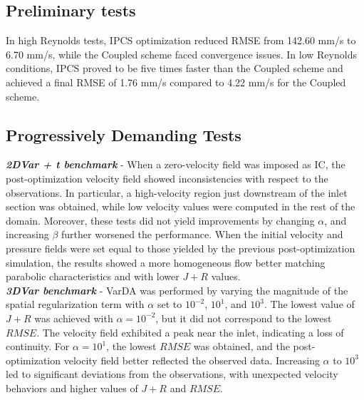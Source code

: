 \subsection*{Preliminary tests}

In high Reynolds tests, IPCS optimization reduced RMSE from 142.60 mm/s to 6.70 mm/s, while the Coupled scheme faced convergence issues. In low Reynolds conditions, IPCS proved to be five times faster than the Coupled scheme and achieved a final RMSE of 1.76 mm/s compared to 4.22 mm/s for the Coupled scheme.

\subsection*{Progressively Demanding Tests} 
\textbf{\textit{2DVar + t benchmark}} - When a zero-velocity field was imposed as IC, the post-optimization velocity field showed inconsistencies with respect to the observations.
In particular, a high-velocity region just downstream of the inlet section was obtained, while low velocity values were computed in the rest of the domain.
Moreover, these tests did not yield improvements by changing \(\alpha\), and increasing \(\beta\) further worsened the performance. When the initial velocity and pressure fields were set equal to those yielded by the previous post-optimization simulation, the results showed a more homogeneous flow better matching parabolic characteristics and with lower \(J + R\) values.\\

\textbf{\textit{3DVar benchmark}} - VarDA was performed by varying the magnitude of the spatial regularization term with \(\alpha\) set to \(10^{-2}\), \(10^{1}\), and \(10^{3}\). The lowest value of \(J + R\) was achieved with \(\alpha = 10^{-2}\), but it did not correspond to the lowest \(RMSE\). The velocity field exhibited a peak near the inlet, indicating a loss of continuity. For \(\alpha = 10^{1}\), the lowest \(RMSE\) was obtained, and the post-optimization velocity field better reflected the observed data. Increasing \(\alpha\) to \(10^{3}\) led to significant deviations from the observations, with unexpected velocity behaviors and higher values of \(J + R\) and \(RMSE\).\\

